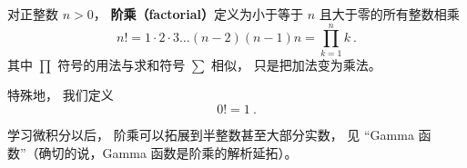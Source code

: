 
\begin{issues}
\issueDraft
\end{issues}

对正整数 $n > 0$， \textbf{阶乘（factorial）}定义为小于等于 $n$ 且大于零的所有整数相乘
\begin{equation}
n! = 1 \cdot 2 \cdot 3 \dots (n - 2) (n - 1)n = \prod_{k = 1}^n k~.
\end{equation}
其中 $\prod$ 符号的用法与求和符号 $\sum$ 相似， 只是把加法变为乘法。 %

特殊地， 我们定义
\begin{equation}
0! = 1~.
\end{equation}

学习微积分以后， 阶乘可以拓展到半整数甚至大部分实数， 见 “Gamma 函数”（确切的说，Gamma 函数是阶乘的解析延拓）。
